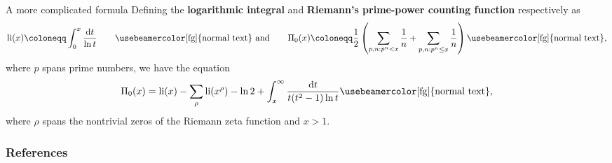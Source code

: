 \documentclass[17pt, t, lualatex]{beamer}
\renewcommand*{\emph}[1]{{\color{digital blue} \bfseries #1}}
\begin{document}
\begin{frame}
\begin{block}{A more complicated formula {\cite{Riemann1859}}}
Defining the \emph{logarithmic integral} and \emph{Riemann's prime-power counting function} respectively as
\[
\textnormal{li}(x) \coloneqq \int_0^x \frac{\textnormal{d}t}{\ln t}
\qquad \textnormal{\usebeamercolor[fg]{normal text} and} \qquad
\Pi_0(x) \coloneqq \frac{1}{2} \left( \sum_{p, n: p^n < x} \frac{1}{n} + \sum_{p, n: p^n \leq x} \frac{1}{n} \right) \textnormal{\usebeamercolor[fg]{normal text},}
\]
where $p$ spans prime numbers, we have the equation
\[
\Pi_0(x) = \textnormal{li}(x) - \sum_{\rho} \textnormal{li}(x^\rho) - \ln 2 + \int_x^\infty \frac{\textnormal{d}t}{t (t^2 - 1) \ln t} \textnormal{\usebeamercolor[fg]{normal text},}
\]
where $\rho$ spans the nontrivial zeros of the Riemann zeta function and $x > 1$.
\end{block}
\end{frame}


\begin{frame}
\insertlines
\frametitle{References}
\begin{minipage}{.65\pagewidth}


\end{minipage}
\end{frame}

\insertendpage
\end{document}
